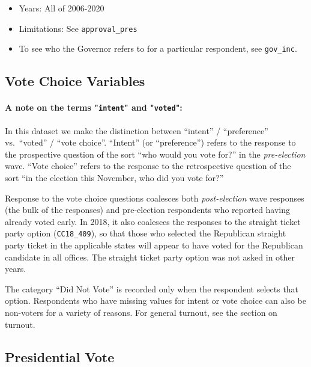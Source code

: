 \documentclass[10pt,article,oneside]{memoir}
\theoremstyle{definition}
\begin{document}
\begin{itemize}
\tightlist
\item
  Years: All of 2006-2020
\item
  Limitations: See \texttt{approval\_pres}
\item
  To see who the Governor refers to for a particular respondent, see
  \texttt{gov\_inc}.
\end{itemize}

\newpage

\hypertarget{vote-choice-variables}{%
\subsection{Vote Choice Variables}\label{vote-choice-variables}}

\paragraph{A note on the terms "\texttt{intent}" and "\texttt{voted}":}

In this dataset we make the distinction between ``intent'' /
``preference'' vs.~``voted'' / ``vote choice''. ``Intent'' (or
``preference'') refers to the response to the prospective question of
the sort ``who would you vote for?'' in the \emph{pre-election} wave.
``Vote choice'' refers to the response to the retrospective question of
the sort ``in the election this November, who did you vote for?''

Response to the vote choice questions coalesces both
\emph{post-election} wave responses (the bulk of the responses) and
pre-election respondents who reported having already voted early. In
2018, it also coalesces the responses to the straight ticket party
option (\texttt{CC18\_409}), so that those who selected the Republican
straight party ticket in the applicable states will appear to have voted
for the Republican candidate in all offices. The straight ticket party
option was not asked in other years.

The category ``Did Not Vote'' is recorded only when the respondent
selects that option. Respondents who have missing values for intent or
vote choice can also be non-voters for a variety of reasons. For general
turnout, see the section on turnout.

\hypertarget{presidential-vote}{%
\subsection{Presidential Vote}\label{presidential-vote}}
\end{document}
